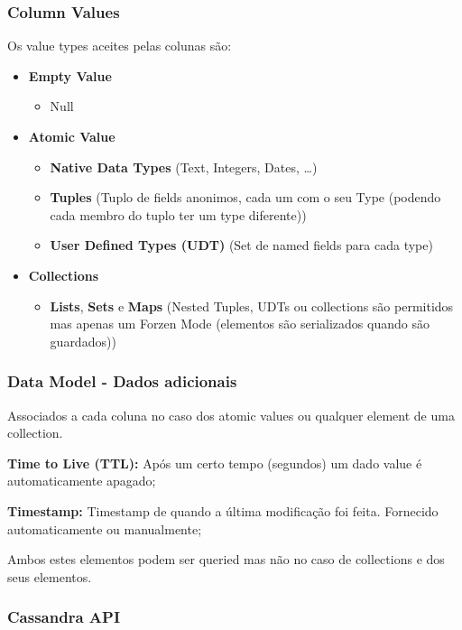 \documentclass{article}
\begin{document}
\subsubsection{Column Values}
\begin{flushleft}
  Os value types aceites pelas colunas são:
  \begin{itemize}
    \item \textbf{Empty Value}
    \begin{itemize}
      \item Null
    \end{itemize}
    \item \textbf{Atomic Value}
    \begin{itemize}
      \item \textbf{Native Data Types} (Text, Integers, Dates, \dots)
      \item \textbf{Tuples} (Tuplo de fields anonimos, cada um com o seu Type
      (podendo cada membro do tuplo ter um type diferente))
      \item \textbf{User Defined Types (UDT)} (Set de named fields para cada type)
    \end{itemize}
    \item \textbf{Collections}
    \begin{itemize}
      \item \textbf{Lists}, \textbf{Sets} e \textbf{Maps} (Nested Tuples, UDTs ou collections são
      permitidos mas apenas um Forzen Mode (elementos são serializados quando
      são guardados))
    \end{itemize}
  \end{itemize}
\end{flushleft}

\subsubsection{Data Model - Dados adicionais}

Associados a cada coluna no caso dos atomic values ou qualquer element de uma
collection.

\begin{flushleft}
  \textbf{Time to Live (TTL):} Após um certo tempo (segundos) um dado value é automaticamente apagado;

  \vspace{2mm}

  \textbf{Timestamp:} Timestamp de quando a última modificação foi feita. Fornecido
  automaticamente ou manualmente;
\end{flushleft}

Ambos estes elementos podem ser queried mas não no caso de collections e dos seus
elementos.

\pagebreak

\subsubsection{Cassandra API}
\end{document}
